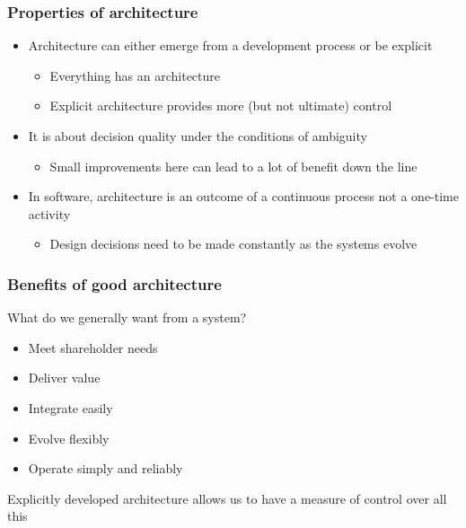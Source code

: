 \documentclass[10pt, compress]{beamer}
\begin{document}
\begin{frame}[fragile]
  \frametitle{Properties of architecture}
	\begin{itemize}
		\item Architecture can either emerge from a development process or be explicit
		\begin{itemize}
			\item Everything has an architecture
			\item Explicit architecture provides more (but not ultimate) control
		\end{itemize}
		\item It is about decision quality under the conditions of ambiguity
		\begin{itemize}
			\item Small improvements here can lead to a lot of benefit down the line
		\end{itemize}
		\item In software, architecture is an outcome of a continuous process not a one-time activity
		\begin{itemize}
			\item Design decisions need to be made constantly as the systems evolve
		\end{itemize}
	\end{itemize}
\end{frame}

\begin{frame}[fragile]
  \frametitle{Benefits of good architecture}
  
  What do we generally want from a system? 
  
  \begin{itemize}
  	\item Meet shareholder needs 
	\item Deliver value
	\item Integrate easily
	\item Evolve flexibly
	\item Operate simply and reliably
  \end{itemize}
  
	Explicitly developed architecture allows us to have a measure of control over all this
\end{frame}
\end{document}
